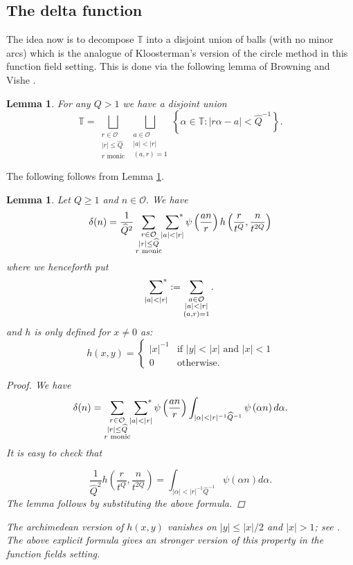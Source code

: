 \documentclass[11pt]{amsart}
\theoremstyle{plain}
\theoremstyle{plain}
\newtheorem{lemma}[theorem]{Lemma}
\theoremstyle{remark}
\theoremstyle{definition}
\renewcommand{\hat}{\widehat}
\newcommand{\hQ}{\widehat{Q}}
\newcommand{\TT}{\mathbb{T}}
\newcommand{\sumstar}{\sideset{}{^*}\sum}
\newcommand{\cO}{\mathcal{O}}
\begin{document}
\subsection{The delta function}The idea now is to decompose $\TT$ into a disjoint union of balls (with no minor arcs) which is the analogue of Kloosterman's version of the circle method in this function field setting. This is done via the following lemma of Browning and Vishe \cite[Lemma~4.2]{Browning}.
\begin{lemma}\label{lem:dissection}
For any $Q>1$ we have a disjoint union 
\[
\TT=\bigsqcup_{\substack{r\in \cO\\ |r|\leq \hat Q\\
\text{$r$ monic}}}
\bigsqcup_{\substack{a\in \cO\\ |a|<|r|\\ (a,r)=1} }
\left\{\alpha\in \TT: |r\alpha-a|<\hat Q^{-1}\right\}.\]
\end{lemma}
The following follows from Lemma \ref{lem:dissection}.
\begin{lemma}\label{delta} Let $Q\geq  1$ and $n\in \cO.$ 
We have 
\begin{equation}\label{deltaeq}
\delta(n)= \frac{1}{\hQ^{2}}
\sum_{\substack{
r\in \cO\\
|r|\leq \hat Q\\
\text{$r$ monic}
} }
\sumstar_{\substack{
|a|<|r|} }
\psi\left(\frac{an}{r}\right) h\left(\frac{r}{t^Q},\frac{n}{t^{2Q}}\right)
\end{equation}
where we henceforth put
\[
\sumstar_{\substack{
|a|<|r| }}
:=\sum_{\substack{
a\in \cO\\ 
|a|<|r|\\ (a,r)=1} }.
\]
and $h$ is only  defined for $x\neq 0$ as:
\[h(x,y)=\begin{cases}|x|^{-1} & \mbox{if $|y|<|x|$ and $|x|<1$}\\ 0 & \mbox{otherwise.}\end{cases}\]
\begin{proof}
We have 
\[\delta(n)= \sum_{\substack{
r\in \cO\\
|r|\leq \hat Q\\
\text{$r$ monic}
} }
\sumstar_{\substack{
|a|<|r|} }
\psi\left(\frac{an}{r}\right)\int_{|\alpha|<|r|^{-1}\hQ^{-1}} \psi\left(\alpha n\right) d \alpha.\] 
It is easy to check that 

\[
\frac{1}{\hQ^{2}}h\left(\frac{r}{t^Q},\frac{n}{t^{2Q}}\right)= \int_{|\alpha|<|r|^{-1}\hQ^{-1}} \psi\left(\alpha n\right) d \alpha.
\label{delta}\]
The lemma follows by substituting the above formula. 
\end{proof}
The archimedean version of $h(x,y)$ vanishes on $|y|\leq |x|/2$ and $|x|>1$; see \cite[Lemma 4]{Heath}. The above explicit formula gives an stronger version of this property in the function fields setting.
\end{lemma}
\end{document}

